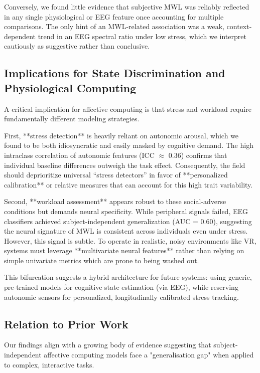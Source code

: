 \documentclass[lettersize,journal]{IEEEtran}
\begin{document}
Conversely, we found little evidence that subjective MWL was reliably reflected in any single physiological or EEG feature once accounting for multiple comparisons. The only hint of an MWL-related association was a weak, context-dependent trend in an EEG spectral ratio under low stress, which we interpret cautiously as suggestive rather than conclusive.


\subsection{Implications for State Discrimination and Physiological Computing}

A critical implication for affective computing is that stress and workload require fundamentally different modeling strategies.

First, **stress detection** is heavily reliant on autonomic arousal, which we found to be both idiosyncratic and easily masked by cognitive demand. The high intraclass correlation of autonomic features (ICC $\approx$ 0.36) confirms that individual baseline differences outweigh the task effect. Consequently, the field should deprioritize universal ``stress detectors'' in favor of **personalized calibration** or relative measures that can account for this high trait variability.

Second, **workload assessment** appears robust to these social-adverse conditions but demands neural specificity. While peripheral signals failed, EEG classifiers achieved subject-independent generalization (AUC = 0.60), suggesting the neural signature of MWL is consistent across individuals even under stress. However, this signal is subtle. To operate in realistic, noisy environments like VR, systems must leverage **multivariate neural features** rather than relying on simple univariate metrics which are prone to being washed out.

This bifurcation suggests a hybrid architecture for future systems: using generic, pre-trained models for cognitive state estimation (via EEG), while reserving autonomic sensors for personalized, longitudinally calibrated stress tracking.




\subsection{Relation to Prior Work}

Our findings align with a growing body of evidence suggesting that subject-independent affective computing models face a "generalisation gap" when applied to complex, interactive tasks. 
\end{document}
